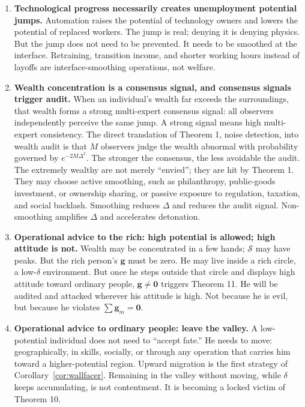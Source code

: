 \documentclass[12pt,a4paper]{article}
\theoremstyle{remark}
\begin{document}
\begin{enumerate}[label=\textbf{(\arabic*)}]

    \item \textbf{Technological progress necessarily creates unemployment potential jumps.} Automation raises the potential of technology owners and lowers the potential of replaced workers. The jump is real; denying it is denying physics. But the jump does not need to be prevented. It needs to be smoothed at the interface. Retraining, transition income, and shorter working hours instead of layoffs are interface-smoothing operations, not welfare.

    \item \textbf{Wealth concentration is a consensus signal, and consensus signals trigger audit.} When an individual's wealth far exceeds the surroundings, that wealth forms a strong multi-expert consensus signal: all observers independently perceive the same jump. A strong signal means high multi-expert consistency. The direct translation of Theorem 1, noise detection, into wealth audit is that $M$ observers judge the wealth abnormal with probability governed by $e^{-2M\Delta^2}$. The stronger the consensus, the less avoidable the audit. The extremely wealthy are not merely ``envied''; they are hit by Theorem 1. They may choose active smoothing, such as philanthropy, public-goods investment, or ownership sharing, or passive exposure to regulation, taxation, and social backlash. Smoothing reduces $\Delta$ and reduces the audit signal. Non-smoothing amplifies $\Delta$ and accelerates detonation.

    \item \textbf{Operational advice to the rich: high potential is allowed; high attitude is not.} Wealth may be concentrated in a few hands; $\mathcal{S}$ may have peaks. But the rich person's $\mathbf{g}$ must be zero. He may live inside a rich circle, a low-$\delta$ environment. But once he steps outside that circle and displays high attitude toward ordinary people, $\mathbf{g} \neq \mathbf{0}$ triggers Theorem 11. He will be audited and attacked wherever his attitude is high. Not because he is evil, but because he violates $\sum\mathbf{g}_m = \mathbf{0}$.

    \item \textbf{Operational advice to ordinary people: leave the valley.} A low-potential individual does not need to ``accept fate.'' He needs to move: geographically, in skills, socially, or through any operation that carries him toward a higher-potential region. Upward migration is the first strategy of Corollary~\ref{cor:wallfacer}. Remaining in the valley without moving, while $\delta$ keeps accumulating, is not contentment. It is becoming a locked victim of Theorem 10.


\end{enumerate}
\end{document}
